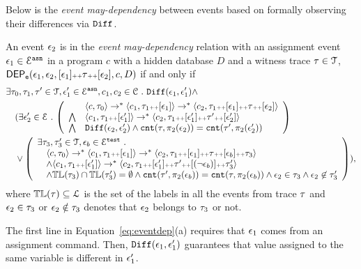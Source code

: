 {Below is the \emph{event may-dependency} between events based on formally observing their differences via $\mathtt{Diff}$.}
\begin{defn}
\label{def:event_dep}
An event $\mathtt{\epsilon}_2$ is in the \emph{event may-dependency} relation with an assignment event $\mathtt{\epsilon}_1 \in \mathcal{E}^{\mathtt{{asn}}}$ in a program ${c}$  with a hidden database $D$ and a witness trace $\mathtt{\tau} \in \mathcal{T}$,
$\mathsf{DEP_{\mathtt{e}}}(\mathtt{\epsilon}_1, \mathtt{\epsilon}_2, [\mathtt{\epsilon}_1 ] {\scriptscriptstyle ++} \mathtt{\tau} {\scriptscriptstyle ++} [\mathtt{\epsilon}_2], c, D)$ if and only if
\begin{subequations}
\begin{align}
&  
\exists \trace_0, \trace_1, \trace' \in \mathcal{T},\event_1' \in \eventset^{\asn}, {c}_1, {c}_2  \in \cdom  \st \diff(\event_1, \event_1') \land \\
& 
\quad (\exists  \event_2' \in \eventset \st 
\left(
\begin{array}{ll}   
  & \config{{c}, \trace_0} \rightarrow^{*} 
  \config{{c}_1, \trace_1 \tracecat [\event_1]}  \rightarrow^{*} 
  \config{{c}_2,  \trace_1 \tracecat [\event_1] \tracecat \trace \tracecat [\event_2] } 
   \\ 
   \bigwedge &
   \config{{c}_1, \trace_1 \tracecat [\event_1']}  \rightarrow^{*}
    \config{{c}_2,  \trace_1 \tracecat[ \event_1'] \tracecat \trace' \tracecat [\event_2'] } 
  \\
  \bigwedge & 
  \diff(\event_2,\event_2' ) \land 
  \vcounter(\trace, \pi_2(\event_2))
  = 
  \vcounter(\trace', \pi_2(\event_2'))\\
  \end{array}
  \right)\\ 
  & 
  \quad
  \lor 
  \left(
  \begin{array}{l} 
  \exists \trace_3, \trace_3'  \in \mathcal{T}, \event_b \in \eventset^{\test} \st 
  \\
   \quad \config{{c}, \trace_0} \rightarrow^{*} \config{{c}_1, \trace_1 \tracecat [\event_1]}  \rightarrow^{*}
   \config{c_2,  \trace_1 \tracecat [\event_1] \tracecat
   \trace \tracecat [\event_b] \tracecat  \trace_3} 
\\ \quad \land
\config{{c}_1, \trace_1 \tracecat [\event_1']}  \rightarrow^{*} 
\config{c_2,  \trace_1 \tracecat [\event_1'] \tracecat \trace' \tracecat [(\neg \event_b)] \tracecat \trace_3'} 
\\
\quad \land \tlabel({\trace_3}) \cap \tlabel({\trace_3'})
= \emptyset
\land \vcounter(\trace', \pi_2(\event_b)) = \vcounter(\trace, \pi_2(\event_b)) 
    \land \event_2 \in \trace_3
    \land \event_2 \not\in \trace_3'
  \end{array}
  \right)
  ),
\end{align}
\label{eq:eventdep}
\end{subequations}
where $\mathbb{TL}(\mathtt{\tau}) \subseteq \mathcal{L}$ is the set of the labels in all the events from trace $\mathtt{\tau}$ and $\mathtt{\epsilon}_2 \in \mathtt{\tau}_3$ or $\mathtt{\epsilon}_2 \notin \mathtt{\tau}_3$ denotes that $\mathtt{\epsilon}_2$ belongs to $\mathtt{\tau}_3$ or not.
\end{defn}
The first line in Equation~\ref{eq:eventdep}(a) requires that $\mathtt{\epsilon}_1$ comes from an assignment command.
Then, $\mathtt{Diff}(\mathtt{\epsilon}_1, \mathtt{\epsilon}_1')$ guarantees that value assigned to the same variable is different in $\mathtt{\epsilon}_1'$.

